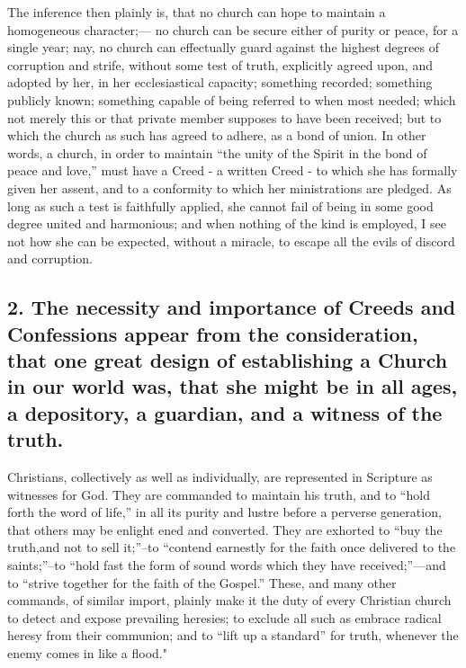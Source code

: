 \documentclass[
]{book}
\begin{document}
The inference then plainly is, that no church can hope to maintain a homogeneous character;--- no church can be secure either of purity or peace, for a single year; nay, no church can effectually guard against the highest degrees of corruption and strife, without some test of truth, explicitly agreed upon, and adopted by her, in her ecclesiastical capacity; something recorded; something publicly known; something capable of being referred to when most needed; which not merely this or that private member supposes to have been received; but to which the church as such has agreed to adhere, as a bond of union. In other words, a church, in order to maintain ``the unity of the Spirit in the bond of peace and love,'' must have a Creed - a written Creed - to which she has formally given her assent, and to a conformity to which her ministrations are pledged. As long as such a test is faithfully applied, she cannot fail of being in some good degree united and harmonious; and when nothing of the kind is employed, I see not how she can be expected, without a miracle, to escape all the evils of discord and corruption.

\hypertarget{the-necessity-and-importance-of-creeds-and-confessions-appear-from-the-consideration-that-one-great-design-of-establishing-a-church-in-our-world-was-that-she-might-be-in-all-ages-a-depository-a-guardian-and-a-witness-of-the-truth.}{%
\subsection{2. The necessity and importance of Creeds and Confessions appear from the consideration, that one great design of establishing a Church in our world was, that she might be in all ages, a depository, a guardian, and a witness of the truth.}\label{the-necessity-and-importance-of-creeds-and-confessions-appear-from-the-consideration-that-one-great-design-of-establishing-a-church-in-our-world-was-that-she-might-be-in-all-ages-a-depository-a-guardian-and-a-witness-of-the-truth.}}

Christians, collectively as well as individually, are represented in Scripture as witnesses for God. They are commanded to maintain his truth, and to ``hold forth the word of life,'' in all its purity and lustre before a perverse generation, that others may be enlight ened and converted. They are exhorted to ``buy the truth,and not to sell it;''--to ``contend earnestly for the faith once delivered to the saints;''--to ``hold fast the form of sound words which they have received;''---and to ``strive together for the faith of the Gospel.'' These, and many other commands, of similar import, plainly make it the duty of every Christian church to detect and expose prevailing heresies; to exclude all such as embrace radical heresy from their communion; and to ``lift up a standard'' for truth, whenever the enemy comes in like a flood."
\end{document}
